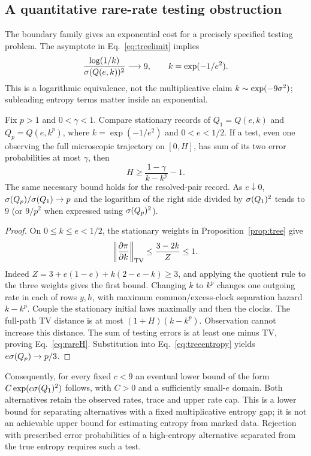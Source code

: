 \subsection{A quantitative rare-rate testing obstruction}\label{sec:rare}
The boundary family gives an exponential cost for a precisely specified testing problem. The asymptote in Eq.~\eqref{eq:treelimit} implies
\begin{equation}
 \frac{\log(1/k)}{\sigma(Q(e,k))^2}\longrightarrow9,
 \qquad k=\exp(-1/e^2).\label{eq:lograre}
\end{equation}
This is a logarithmic equivalence, not the multiplicative claim
$k\sim\exp(-9\sigma^2)$; subleading entropy terms matter inside an exponential.

\begin{proposition}\label{prop:rare}
Fix $p>1$ and $0<\gamma<1$. Compare stationary records of
$Q_1=Q(e,k)$ and $Q_p=Q(e,k^p)$, where $k=\exp(-1/e^2)$ and $0<e<1/2$.
If a test, even one observing the full microscopic trajectory on $[0,H]$, has sum of its two error probabilities at most $\gamma$, then
\begin{equation}
 H\ge\frac{1-\gamma}{k-k^p}-1.\label{eq:rareH}
\end{equation}
The same necessary bound holds for the resolved-pair record. As $e\downarrow0$, $\sigma(Q_p)/\sigma(Q_1)\to p$ and the logarithm of the right side divided by $\sigma(Q_1)^2$ tends to $9$ (or $9/p^2$ when expressed using $\sigma(Q_p)^2$).
\end{proposition}
\begin{proof}
On $0\le k\le e<1/2$, the stationary weights in Proposition~\ref{prop:tree} give
\begin{equation}
 \left\|\frac{\partial\pi}{\partial k}\right\|_{\operatorname{TV}}
 \le\frac{3-2k}{Z}\le1.
\end{equation}
Indeed $Z=3+e(1-e)+k(2-e-k)\ge3$, and applying the quotient rule to the three weights gives the first bound. Changing $k$ to $k^p$ changes one outgoing rate in each of rows $y,h$, with maximum common/excess-clock separation hazard $k-k^p$. Couple the stationary initial laws maximally and then the clocks. The full-path TV distance is at most $(1+H)(k-k^p)$. Observation cannot increase this distance. The sum of testing errors is at least one minus TV, proving Eq.~\eqref{eq:rareH}. Substitution into Eq.~\eqref{eq:treeentropy} yields $e\sigma(Q_p)\to p/3$.
\end{proof}

Consequently, for every fixed $c<9$ an eventual lower bound of the form $C\exp(c\sigma(Q_1)^2)$ follows, with $C>0$ and a sufficiently small-$e$ domain. Both alternatives retain the observed rates, trace and upper rate cap. This is a lower bound for separating alternatives with a fixed multiplicative entropy gap; it is not an achievable upper bound for estimating entropy from marked data. Rejection with prescribed error probabilities of a high-entropy alternative separated from the true entropy requires such a test.

